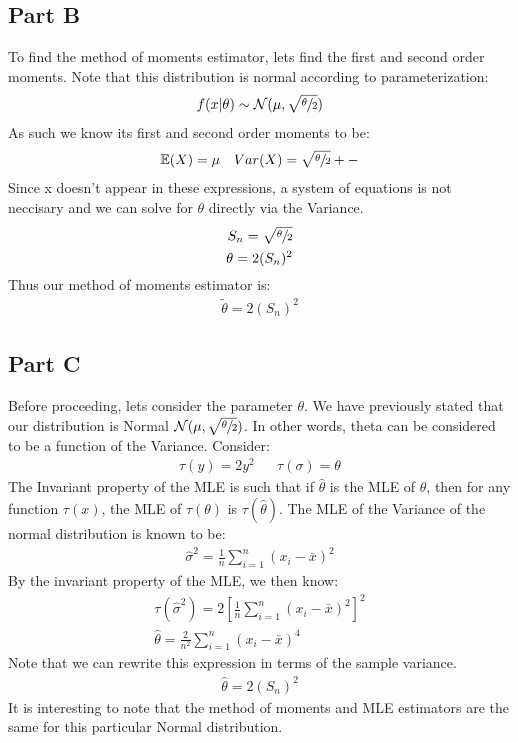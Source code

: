 \documentclass{article}
\begin{document}
\subsection*{Part B}
To find the method of moments estimator, lets find the first and second order moments. Note that this distribution is normal according to parameterization:
\begin{align*}
f(x|\theta) \sim \mathcal{N}(\mu,\sqrt{\sfrac{\theta}{2}})
\end{align*}
As such we know its first and second order moments to be:
\begin{align*}
\mathbb{E}(X) = \mu && Var(X) = \sqrt{\sfrac{\theta}{2}}+-
\end{align*}
Since x doesn't appear in these expressions, a system of equations is not neccisary and we can solve for $\theta$ directly via the Variance.
\begin{align*}
S_n = \sqrt{\sfrac{\theta}{2}} \\
\theta = 2 (S_n)^2
\end{align*}
Thus our method of moments estimator is:
\begin{align*}
\boxed{ \tilde{\theta} = 2 (S_n)^2 }
\end{align*}


\subsection*{Part C}
Before proceeding, lets consider the parameter $\theta$. We have previously stated that our distribution is Normal $\mathcal{N}(\mu,\sqrt{\sfrac{\theta}{2}})$. In other words, theta can be considered to be a function of the Variance. Consider:
\begin{align*}
\tau(y) =  2 y^2 && \tau(\sigma) = \theta
\end{align*}
The Invariant property of the MLE is such that if $\hat{ \theta }$ is the MLE of $\theta$, then for any function $\tau(x)$, the MLE of $\tau(\theta)$ is $\tau(\hat{\theta})$. The MLE of the Variance of the normal distribution is known to be:
\begin{align*}
\hat{\sigma}^2 = \frac{1}{n} \sum_{i=1}^{n} (x_i-\bar{x})^2
\end{align*}
By the invariant property of the MLE, we then know:
\begin{align*}
\tau(\hat{\sigma}^2) = 2[\frac{1}{n} \sum_{i=1}^{n} (x_i-\bar{x})^2]^2 \\
\hat{\theta} = \frac{2}{n^2} \sum_{i=1}^{n} (x_i-\bar{x})^4
\end{align*}
Note that we can rewrite this expression in terms of the sample variance.
\begin{align*}
\boxed{ \hat{\theta} = 2 (S_n)^2 }
\end{align*}
It is interesting to note that the method of moments and MLE estimators are the same for this particular Normal distribution.
\end{document}
